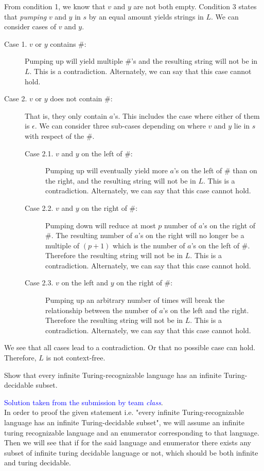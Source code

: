 \documentclass[a4page]{exam}
\begin{document}
\begin{questions}
\begin{solution}
    From condition 1, we know that $v$ and $y$ are not both empty. Condition 3 states that \textit{pumping} $v$ and $y$ in $s$ by an equal amount yields strings in $L$. We can consider cases of $v$ and $y$.
    \begin{description}
    \item[Case 1. $v$ or $y$ contains \#:] Pumping up will yield multiple \#'s and the resulting string will not be in $L$. This is a contradiction. Alternately, we can say that this case cannot hold.
    \item[Case 2. $v$ or $y$ does not contain \#:] That is, they only contain $a$'s. This includes the case where either of them is $\epsilon$. We can consider three sub-cases depending on where $v$ and $y$ lie in $s$ with respect of the \#.
      \begin{description}
      \item[Case 2.1.  $v$ and $y$ on the left of \#:] Pumping up will eventually yield more $a$'s on the left of \# than on the right, and the resulting string will not be in $L$. This is a contradiction. Alternately, we can say that this case cannot hold.
      \item[Case 2.2. $v$ and $y$ on the right of \#:] Pumping down will reduce at most $p$ number of $a$'s on the right of \#. The resulting number of $a$'s on the right will no longer be a multiple of $(p+1)$ which is the number of $a$'s on the left of \#. Therefore the resulting string will not be in $L$. This is a contradiction. Alternately, we can say that this case cannot hold.
      \item[Case 2.3. $v$ on the left and $y$ on the right of \#:] Pumping up an arbitrary number of times will break the relationship between the number of $a$'s on the left and the right. Therefore the resulting string will not be in $L$. This is a contradiction. Alternately, we can say that this case cannot hold.
      \end{description}
    \end{description}

    We see that all cases lead to a contradiction. Or that no possible case can hold. Therefore, $L$ is not context-free.
  \end{solution}
  
\question[20] Show that every infinite Turing-recognizable language has an infinite Turing-decidable subset.
  \begin{solution}
    \textcolor{blue}{Solution taken from the submission by team \textit{class}}.\\
    In order to proof the given statement i.e. "every infinite Turing-recognizable language has an infinite Turing-decidable subset", we will assume an infinite turing recognizable language and an enumerator corresponding to that language. Then we will see that if for the said language and enumerator there exists any subset of infinite turing decidable language or not, which should be both infinite and turing decidable.
    

\end{solution}
\end{questions}
\end{document}
